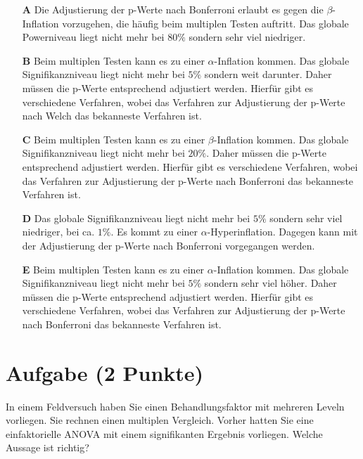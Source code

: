 \documentclass[a4paper, 9pt]{scrartcl}\usepackage[]{graphicx}\usepackage[]{xcolor}
\begin{document}
\begin{enumerate}
\item [\textbf{A} \msquare] Die Adjustierung der p-Werte nach Bonferroni erlaubt es gegen die $\beta$-Inflation vorzugehen, die häufig beim multiplen Testen auftritt. Das globale Powerniveau liegt nicht mehr bei $80\%$ sondern sehr viel niedriger.
\item [\textbf{B} \msquare] Beim multiplen Testen kann es zu einer $\alpha$-Inflation kommen. Das globale Signifikanzniveau liegt nicht mehr bei $5\%$ sondern weit darunter. Daher müssen die p-Werte entsprechend adjustiert werden. Hierfür gibt es verschiedene Verfahren, wobei das Verfahren zur Adjustierung der p-Werte nach Welch das bekanneste Verfahren ist.
\item [\textbf{C} \msquare] Beim multiplen Testen kann es zu einer $\beta$-Inflation kommen. Das globale Signifikanzniveau liegt nicht mehr bei $20\%$. Daher müssen die p-Werte entsprechend adjustiert werden. Hierfür gibt es verschiedene Verfahren, wobei das Verfahren zur Adjustierung der p-Werte nach Bonferroni das bekanneste Verfahren ist.
\item [\textbf{D} \msquare] Das globale Signifikanzniveau liegt nicht mehr bei $5\%$ sondern sehr viel niedriger, bei ca. $1\%$. Es kommt zu einer $\alpha$-Hyperinflation. Dagegen kann mit der Adjustierung der p-Werte nach Bonferroni vorgegangen werden.
\item [\textbf{E} \msquare] Beim multiplen Testen kann es zu einer $\alpha$-Inflation kommen. Das globale Signifikanzniveau liegt nicht mehr bei $5\%$ sondern sehr viel höher. Daher müssen die p-Werte entsprechend adjustiert werden. Hierfür gibt es verschiedene Verfahren, wobei das Verfahren zur Adjustierung der p-Werte nach Bonferroni das bekanneste Verfahren ist.
\end{enumerate}

\section{Aufgabe \hfill (2 Punkte)}




In einem Feldversuch haben Sie einen Behandlungsfaktor mit mehreren Leveln vorliegen. Sie rechnen einen multiplen Vergleich. Vorher hatten Sie eine einfaktorielle ANOVA mit einem signifikanten Ergebnis vorliegen. Welche Aussage ist richtig?
\end{document}
